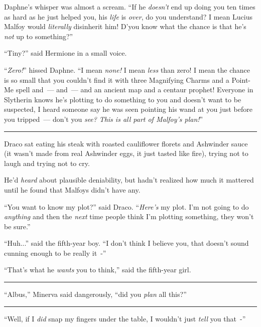 Daphne's whisper was almost a scream. ``If he \emph{doesn't} end up doing you ten times as hard as he just helped you, his \emph{life} is \emph{over}, do you understand? I mean Lucius Malfoy would \emph{literally} disinherit him! D'you know what the chance is that he's \emph{not} up to something?''

``Tiny?'' said Hermione in a small voice.

``\emph{Zero!}'' hissed Daphne. ``I mean \emph{none!} I mean \emph{less} than zero! I mean the chance is so small that you couldn't find it with three Magnifying Charms and a Point-Me spell and~--- and~--- and an ancient map and a centaur prophet! Everyone in Slytherin knows he's plotting to do something to you and doesn't want to be suspected, I heard someone say he was seen pointing his wand at you just before you tripped~--- don't you \emph{see?} \emph{This is all part of Malfoy's plan!}''

\begin{center}\rule{3in}{0.4pt}\end{center}

Draco sat eating his steak with roasted cauliflower florets and Ashwinder sauce (it wasn't made from real Ashwinder eggs, it just tasted like fire), trying not to laugh and trying not to cry.

He'd \emph{heard} about plausible deniability, but hadn't realized how much it mattered until he found that Malfoys didn't have any.

``You want to know my plot?'' said Draco. ``\emph{Here's} my plot. I'm not going to do \emph{anything} and then the \emph{next} time people think I'm plotting something, they won't be sure.''

``Huh...'' said the fifth-year boy. ``I don't think I believe you, that doesn't sound cunning enough to be really it~-''

``That's what he \emph{wants} you to think,'' said the fifth-year girl.

\begin{center}\rule{3in}{0.4pt}\end{center}

``Albus,'' Minerva said dangerously, ``did you \emph{plan} all this?''

\begin{center}\rule{3in}{0.4pt}\end{center}

``Well, if I \emph{did} snap my fingers under the table, I wouldn't just \emph{tell} you that~-''

